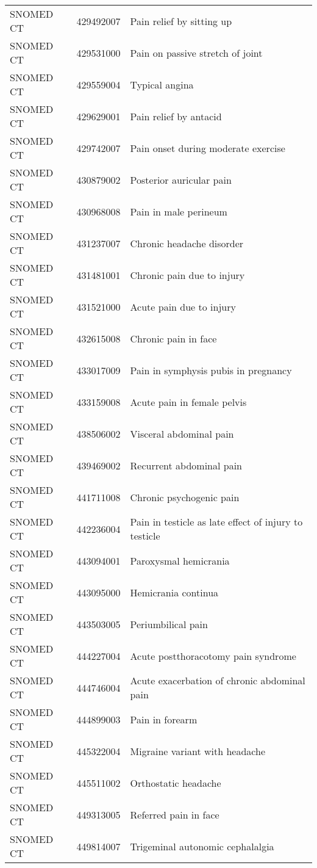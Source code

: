 \begin{longtable}{p{}p{}p{}}
  SNOMED CT & 429492007 & Pain relief by sitting up \\ 
  SNOMED CT & 429531000 & Pain on passive stretch of joint \\ 
  SNOMED CT & 429559004 & Typical angina \\ 
  SNOMED CT & 429629001 & Pain relief by antacid \\ 
  SNOMED CT & 429742007 & Pain onset during moderate exercise \\ 
  SNOMED CT & 430879002 & Posterior auricular pain \\ 
  SNOMED CT & 430968008 & Pain in male perineum \\ 
  SNOMED CT & 431237007 & Chronic headache disorder \\ 
  SNOMED CT & 431481001 & Chronic pain due to injury \\ 
  SNOMED CT & 431521000 & Acute pain due to injury \\ 
  SNOMED CT & 432615008 & Chronic pain in face \\ 
  SNOMED CT & 433017009 & Pain in symphysis pubis in pregnancy \\ 
  SNOMED CT & 433159008 & Acute pain in female pelvis \\ 
  SNOMED CT & 438506002 & Visceral abdominal pain \\ 
  SNOMED CT & 439469002 & Recurrent abdominal pain \\ 
  SNOMED CT & 441711008 & Chronic psychogenic pain \\ 
  SNOMED CT & 442236004 & Pain in testicle as late effect of injury to testicle \\ 
  SNOMED CT & 443094001 & Paroxysmal hemicrania \\ 
  SNOMED CT & 443095000 & Hemicrania continua \\ 
  SNOMED CT & 443503005 & Periumbilical pain \\ 
  SNOMED CT & 444227004 & Acute postthoracotomy pain syndrome \\ 
  SNOMED CT & 444746004 & Acute exacerbation of chronic abdominal pain \\ 
  SNOMED CT & 444899003 & Pain in forearm \\ 
  SNOMED CT & 445322004 & Migraine variant with headache \\ 
  SNOMED CT & 445511002 & Orthostatic headache \\ 
  SNOMED CT & 449313005 & Referred pain in face \\ 
  SNOMED CT & 449814007 & Trigeminal autonomic cephalalgia \\ 

\end{longtable}
